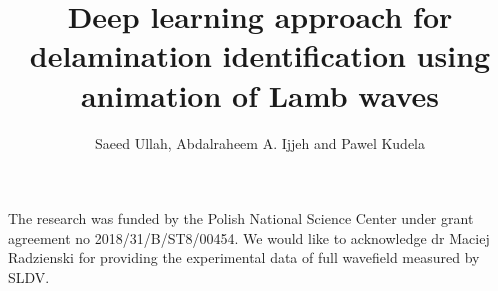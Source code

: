 \documentclass[Afour,times,sagev]{sagej}
\begin{document}

\title{Deep learning approach for delamination identification using 
	animation of Lamb waves}

\author{Saeed Ullah, Abdalraheem A. Ijjeh and Pawel 
Kudela}




\begin{abstract}

\end{abstract}


\maketitle








\begin{acks}
The research was funded by the Polish National Science Center under grant 
agreement no 2018/31/B/ST8/00454.
We would like to acknowledge dr Maciej Radzienski for providing the 
experimental data of full wavefield measured by SLDV.
\end{acks}



\end{document}
